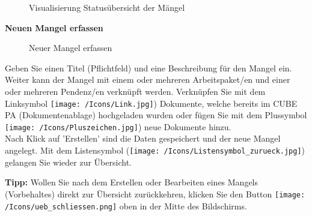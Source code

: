 \begin{figure}[H]
\caption{Visualisierung Statusübersicht der Mängel}
\end{figure}

\textbf{Neuen Mangel erfassen}

\begin{figure}[H]
\caption{Neuer Mangel erfassen}
\end{figure}

Geben Sie einen Titel (Pflichtfeld) und eine Beschreibung für den Mangel ein. Weiter kann der Mangel mit einem oder mehreren Arbeitspaket/en und einer oder mehreren Pendenz/en verknüpft werden. Verknüpfen Sie mit dem Linksymbol \texttt{[image: /Icons/Link.jpg]}) Dokumente, welche bereits im CUBE PA (Dokumentenablage) hochgeladen wurden oder fügen Sie mit dem Plussymbol \texttt{[image: /Icons/Pluszeichen.jpg]}) neue Dokumente hinzu.\\

Nach Klick auf 'Erstellen' sind die Daten gespeichert und der neue Mangel angelegt. Mit dem Listensymbol (\texttt{[image: /Icons/Listensymbol\_zurueck.jpg]}) gelangen Sie wieder zur Übersicht.

\vspace{\baselineskip}

\textbf{Tipp:} Wollen Sie nach dem Erstellen oder Bearbeiten eines Mangels (Vorbehaltes) direkt zur Übersicht zurückkehren, klicken Sie den Button \texttt{[image: /Icons/ueb\_schliessen.png]} oben in der Mitte des Bildschirms.

